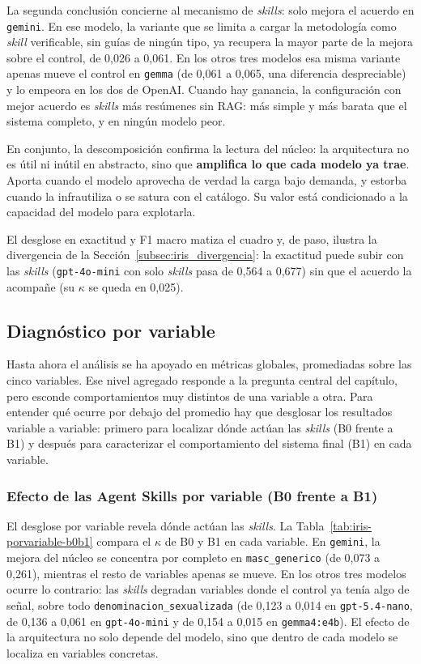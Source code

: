 La segunda conclusión concierne al mecanismo de \textit{skills}: solo mejora el
acuerdo en \texttt{gemini}. En ese modelo, la variante que se limita a cargar la
metodología como \textit{skill} verificable, sin guías de ningún tipo, ya recupera
la mayor parte de la mejora sobre el control, de 0,026 a 0,061. En los otros
tres modelos esa misma variante apenas mueve el control en \texttt{gemma}
(de 0,061 a 0,065, una diferencia despreciable) y lo empeora en los dos de OpenAI. Cuando hay ganancia, la configuración con mejor acuerdo es
\textit{skills} más resúmenes sin RAG: más simple y más barata que el
sistema completo, y en ningún modelo peor.

En conjunto, la descomposición confirma la lectura del núcleo: la arquitectura no es
útil ni inútil en abstracto, sino que \textbf{amplifica lo que cada modelo ya trae}.
Aporta cuando el modelo aprovecha de verdad la carga bajo demanda, y estorba cuando la
infrautiliza o se satura con el catálogo. Su valor está condicionado a la capacidad
del modelo para explotarla.

El desglose en exactitud y F1 macro matiza el cuadro y, de paso, ilustra la
divergencia de la Sección~\ref{subsec:iris_divergencia}: la exactitud puede subir con
las \textit{skills} (\texttt{gpt-4o-mini} con solo \textit{skills} pasa de 0,564 a
0,677) sin que el acuerdo la acompañe (su $\kappa$ se queda en 0,025).


\subsection{Diagnóstico por variable}
\label{subsec:iris_diagnostico}

Hasta ahora el análisis se ha apoyado en métricas globales, promediadas sobre las
cinco variables. Ese nivel agregado responde a la pregunta central del capítulo,
pero esconde comportamientos muy distintos de una variable a otra. Para entender qué
ocurre por debajo del promedio hay que desglosar los resultados variable a variable:
primero para localizar dónde actúan las \textit{skills} (B0 frente a B1) y después
para caracterizar el comportamiento del sistema final (B1) en cada variable.

\subsubsection{Efecto de las Agent Skills por variable (B0 frente a B1)}

El desglose por variable revela dónde actúan las \textit{skills}. La
Tabla~\ref{tab:iris-porvariable-b0b1} compara el $\kappa$ de B0 y B1 en cada
variable. En \texttt{gemini}, la mejora del núcleo se concentra por completo en
\texttt{masc\_generico} (de 0,073 a 0,261), mientras el resto de variables apenas se
mueve. En los otros tres modelos ocurre lo contrario: las \textit{skills} degradan
variables donde el control ya tenía algo de señal, sobre todo
\texttt{denominacion\_sexualizada} (de 0,123 a 0,014 en \texttt{gpt-5.4-nano}, de
0,136 a 0,061 en \texttt{gpt-4o-mini} y de 0,154 a 0,015 en \texttt{gemma4:e4b}). El
efecto de la arquitectura no solo depende del modelo, sino que dentro de cada modelo
se localiza en variables concretas.

